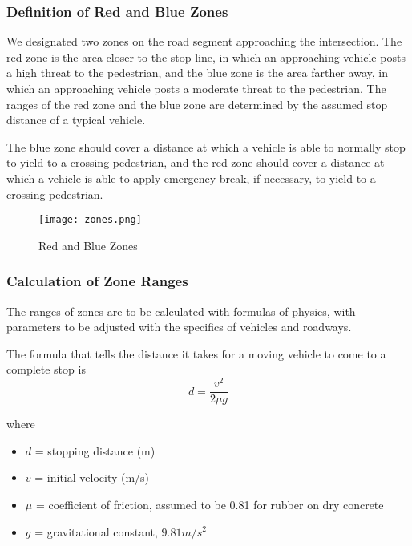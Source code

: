 \documentclass{article}
\begin{document}
\subsubsection{Definition of Red and Blue Zones}
We designated two zones on the road segment approaching the intersection. The red zone is the area closer to the stop line, in which an approaching vehicle posts a high threat to the pedestrian, and the blue zone is the area farther away, in which an approaching vehicle posts a moderate threat to the pedestrian. The ranges of the red zone and the blue zone are determined by the assumed stop distance of a typical vehicle.

The blue zone should cover a distance at which a vehicle is able to normally stop to yield to a crossing pedestrian, and the red zone should cover a distance at which a vehicle is able to apply emergency break, if necessary, to yield to a crossing pedestrian. 

\begin{figure}
\centering
\texttt{[image: zones.png]}
\caption{Red and Blue Zones}
\label{fig:zones}
\end{figure}

\subsubsection{Calculation of Zone Ranges}
The ranges of zones are to be calculated with formulas of physics, with parameters to be adjusted with the specifics of vehicles and roadways.

The formula that tells the distance it takes for a moving vehicle to come to a complete stop is
\begin{equation}
    \displaystyle d = \frac{v^2}{2\mu g}
\end{equation}

where
\begin{itemize}[noitemsep]
    \item $d$ = stopping distance (m)
    \item $v$ = initial velocity (m/s)
    \item $\mu$ = coefficient of friction, assumed to be 0.81 for rubber on dry concrete 
    \item $g$ = gravitational constant, $9.81 m/s^2$
\end{itemize}
\end{document}
